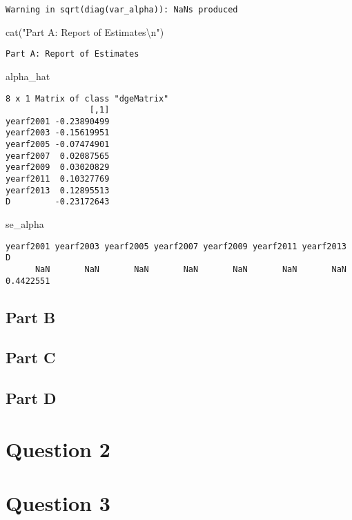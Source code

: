 \documentclass[
  letterpaper,
  DIV=11,
  numbers=noendperiod]{scrartcl}
\newenvironment{Shaded}{\begin{snugshade}}{\end{snugshade}}
\newcommand{\FunctionTok}[1]{\textcolor[rgb]{0.28,0.35,0.67}{#1}}
\newcommand{\NormalTok}[1]{\textcolor[rgb]{0.00,0.23,0.31}{#1}}
\newcommand{\SpecialCharTok}[1]{\textcolor[rgb]{0.37,0.37,0.37}{#1}}
\newcommand{\StringTok}[1]{\textcolor[rgb]{0.13,0.47,0.30}{#1}}
\begin{document}
\begin{verbatim}
Warning in sqrt(diag(var_alpha)): NaNs produced
\end{verbatim}

\begin{Shaded}
\begin{Highlighting}[]
\FunctionTok{cat}\NormalTok{(}\StringTok{"Part A: Report of Estimates}\SpecialCharTok{\textbackslash{}n}\StringTok{"}\NormalTok{)}
\end{Highlighting}
\end{Shaded}

\begin{verbatim}
Part A: Report of Estimates
\end{verbatim}

\begin{Shaded}
\begin{Highlighting}[]
\NormalTok{alpha\_hat}
\end{Highlighting}
\end{Shaded}

\begin{verbatim}
8 x 1 Matrix of class "dgeMatrix"
                 [,1]
yearf2001 -0.23890499
yearf2003 -0.15619951
yearf2005 -0.07474901
yearf2007  0.02087565
yearf2009  0.03020829
yearf2011  0.10327769
yearf2013  0.12895513
D         -0.23172643
\end{verbatim}

\begin{Shaded}
\begin{Highlighting}[]
\NormalTok{se\_alpha}
\end{Highlighting}
\end{Shaded}

\begin{verbatim}
yearf2001 yearf2003 yearf2005 yearf2007 yearf2009 yearf2011 yearf2013         D 
      NaN       NaN       NaN       NaN       NaN       NaN       NaN 0.4422551 
\end{verbatim}

\subsection{Part B}\label{part-b}

\subsection{Part C}\label{part-c}

\subsection{Part D}\label{part-d}

\section{Question 2}\label{question-2}

\section{Question 3}\label{question-3}
\end{document}
